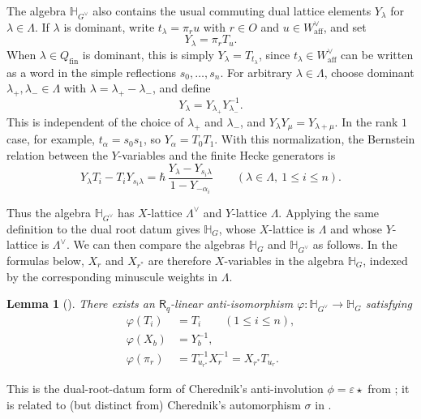 \documentclass{amsart}
\newcommand{\Ring}{\mathsf{R}}
\newtheorem{Lem}[Thm]{Lemma}
\theoremstyle{definition}
\numberwithin{equation}{section}
\begin{document}
The algebra $\mathbb{H}_{G^\vee}$ also contains the usual commuting dual lattice
elements $Y_\lambda$ for \(\lambda\in\Lambda\).  If \(\lambda\) is dominant, write \(t_\lambda=\pi_r u\) with
\(r\in O\) and \(u\in W_{\mathrm{aff}}^\vee\), and set
\[
Y_\lambda=\pi_r T_u.
\]
When \(\lambda\in Q_{\mathrm{fin}}\) is dominant, this is simply \(Y_\lambda=T_{t_\lambda}\), since
\(t_\lambda\in W_{\mathrm{aff}}^\vee\) can be written as a word in the simple
reflections \(s_0,\ldots,s_n\).
For arbitrary \(\lambda\in \Lambda\), choose dominant \(\lambda_+,\lambda_-\in \Lambda\) with
\(\lambda=\lambda_+-\lambda_-\), and define
\[
Y_\lambda=Y_{\lambda_+}Y_{\lambda_-}^{-1}.
\]
This is independent of the choice of
\(\lambda_+\) and \(\lambda_-\), and \(Y_\lambda Y_\mu=Y_{\lambda+\mu}\). In the rank $1$ case, for
example, \(t_\alpha=s_0s_1\), so \(Y_{\alpha}=T_0T_1\). With this
normalization, the Bernstein relation between the \(Y\)-variables and the
finite Hecke generators is
\begin{equation}\label{eq:source-y-bernstein}
Y_\lambda T_i-T_iY_{s_i\lambda}
=
\hbar\,\frac{Y_\lambda-Y_{s_i\lambda}}{1-Y_{-\alpha_i}}
\qquad
(\lambda\in\Lambda,\ 1\leqslant i\leqslant n).
\end{equation}

Thus the algebra \(\mathbb H_{G^\vee}\) has \(X\)-lattice \(\Lambda^\vee\)
and \(Y\)-lattice \(\Lambda\). Applying the same definition to the dual root
datum gives \(\mathbb H_G\), whose \(X\)-lattice is \(\Lambda\) and whose
\(Y\)-lattice is \(\Lambda^\vee\). We can then compare the algebras $\mathbb{H}_G$ and $\mathbb{H}_{G^\vee}$ as follows.
In the formulas below, \(X_r\) and \(X_{r^*}\) are therefore \(X\)-variables
in the algebra \(\mathbb H_G\), indexed by the corresponding minuscule
weights in \(\Lambda\).

\begin{Lem}[{\cite[\S 3.2.2]{Cherednik}}]
    There exists an $\Ring_q$-linear anti-isomorphism $\varphi : \mathbb{H}_{G^\vee} \to \mathbb{H}_{G}$ satisfying
    \begin{align*}
        \varphi(T_i) & = T_i \qquad (1\leqslant i\leqslant n),\\
        \varphi(X_b) & = Y_b^{-1},\\
        \varphi(\pi_r) & = T_{u_{r^*}}^{-1}X_r^{-1}
        =X_{r^*}T_{u_r}.
    \end{align*}
\end{Lem}

This is the dual-root-datum form of Cherednik's anti-involution
\(\phi=\varepsilon\star\) from \cite[(3.3.20)]{Cherednik}; it is related to (but distinct from) Cherednik's automorphism
\(\sigma\) in \cite[(3.2.15)]{Cherednik}.
\end{document}
